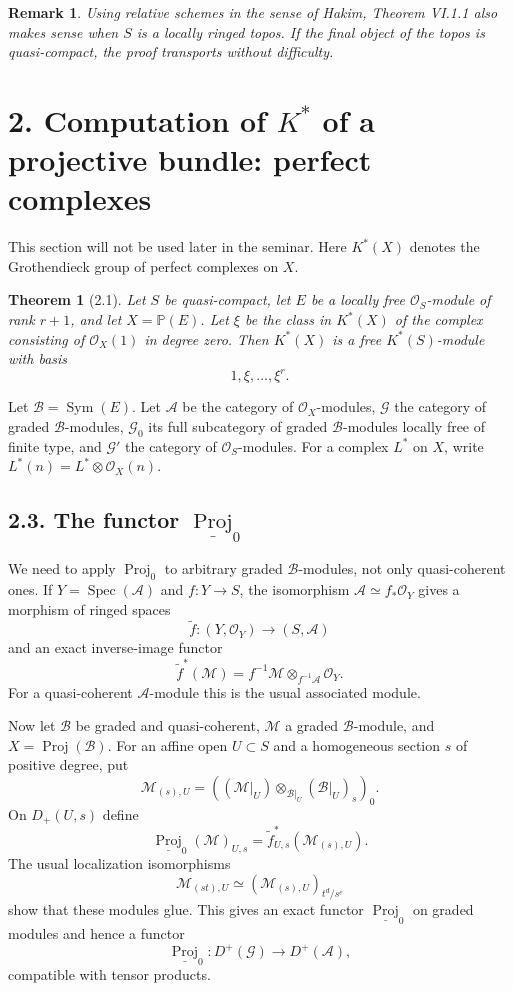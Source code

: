\documentclass[13pt]{extarticle}
\newcommand{\cO}{\mathcal O}
\newcommand{\Sym}{\operatorname{Sym}}
\newcommand{\Spec}{\operatorname{Spec}}
\newcommand{\Proj}{\operatorname{Proj}}
\newtheorem*{theorem}{Theorem}
\newtheorem*{remark}{Remark}
\begin{document}
\begin{remark}
Using relative schemes in the sense of Hakim, Theorem VI.1.1 also makes sense when $S$ is a locally ringed topos. If the final object of the topos is quasi-compact, the proof transports without difficulty.
\end{remark}

\section*{2. Computation of $K^*$ of a projective bundle: perfect complexes}

This section will not be used later in the seminar. Here $K^*(X)$ denotes the Grothendieck group of perfect complexes on $X$.

\begin{theorem}[2.1]\label{thm:VI.2.1}
Let $S$ be quasi-compact, let $E$ be a locally free $\cO_S$-module of rank $r+1$, and let $X=\mathbb P(E)$. Let $\xi$ be the class in $K^*(X)$ of the complex consisting of $\cO_X(1)$ in degree zero. Then $K^*(X)$ is a free $K^*(S)$-module with basis
\[
1,\xi,\ldots,\xi^r.
\]
\end{theorem}

Let $\mathcal B=\Sym(E)$. Let $\mathcal A$ be the category of $\cO_X$-modules, $\mathcal G$ the category of graded $\mathcal B$-modules, $\mathcal G_0$ its full subcategory of graded $\mathcal B$-modules locally free of finite type, and $\mathcal G'$ the category of $\cO_S$-modules. For a complex $L^*$ on $X$, write $L^*(n)=L^*\otimes\cO_X(n)$.

\subsection*{2.3. The functor $\underline{\Proj}_0$}
We need to apply $\Proj_0$ to arbitrary graded $\mathcal B$-modules, not only quasi-coherent ones. If $Y=\Spec(\mathcal A)$ and $f:Y\to S$, the isomorphism $\mathcal A\simeq f_*\cO_Y$ gives a morphism of ringed spaces
\[
\widetilde f:(Y,\cO_Y)\longrightarrow(S,\mathcal A)
\]
and an exact inverse-image functor
\[
\widetilde f^*(\mathcal M)=f^{-1}\mathcal M\otimes_{f^{-1}\mathcal A}\cO_Y.
\]
For a quasi-coherent $\mathcal A$-module this is the usual associated module.

Now let $\mathcal B$ be graded and quasi-coherent, $\mathcal M$ a graded $\mathcal B$-module, and $X=\Proj(\mathcal B)$. For an affine open $U\subset S$ and a homogeneous section $s$ of positive degree, put
\[
\mathcal M_{(s),U}=((\mathcal M|_U)\otimes_{\mathcal B|_U}(\mathcal B|_U)_s)_0.
\]
On $D_+(U,s)$ define
\[
\underline{\Proj}_0(\mathcal M)_{U,s}=\widetilde f_{U,s}^{*}(\mathcal M_{(s),U}).
\]
The usual localization isomorphisms
\[
\mathcal M_{(st),U}\simeq (\mathcal M_{(s),U})_{t^d/s^e}
\]
show that these modules glue. This gives an exact functor $\underline{\Proj}_0$ on graded modules and hence a functor
\[
\underline{\Proj}_0:D^+(\mathcal G)\longrightarrow D^+(\mathcal A),
\]
compatible with tensor products.
\end{document}
